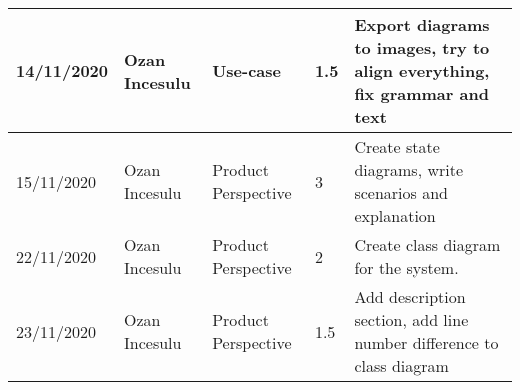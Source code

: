 \begin{table}[h]
\begin{tabular}{|p{2cm}|p{2cm}|p{2cm}|p{1.5cm}|p{8cm}|}
        14/11/2020 & Ozan Incesulu & Use-case          & 1.5              & Export diagrams to images, try to align everything, fix grammar and text \\ \hline
        15/11/2020 & Ozan Incesulu & Product Perspective & 3              & Create state diagrams, write scenarios and explanation \\ \hline
        22/11/2020 & Ozan Incesulu & Product Perspective & 2              & Create class diagram for the system. \\ \hline
        23/11/2020 & Ozan Incesulu & Product Perspective & 1.5            & Add description section, add line number difference to class diagram \\ \hline
    \end{tabular}
\end{table}

